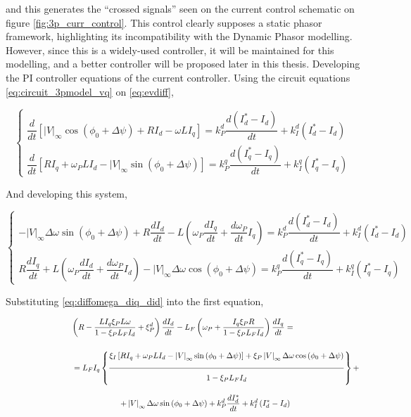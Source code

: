 \begin{example}
	\noindent and this generates the ``crossed signals'' seen on the current control schematic on figure \ref{fig:3p_curr_control}. This control clearly supposes a static phasor framework, highlighting its incompatibility with the Dynamic Phasor modelling. However, since this is a widely-used controller, it will be maintained for this modelling, and a better controller will be proposed later in this thesis. Developing the PI controller equations of the current controller. Using the circuit equations \eqref{eq:circuit_3pmodel_vq} on \eqref{eq:evdiff},

\begin{equation}
\left\{\begin{array}{l}
\dfrac{d}{dt}\left[\left|V\right|_\infty\cos\left(\phi_0+\Delta\psi\right) + RI_d - \omega LI_q\right] = k_P^d\dfrac{d\left(I_d^* - I_d\right)}{dt} + k_I^d\left(I_d^* - I_d\right) \\[5mm]
%
\dfrac{d}{dt}\left[R I_q + \omega_P L I_d - \left|V\right|_\infty\sin\left(\phi_0+\Delta\psi\right)\right] = k_P^q\dfrac{d\left(I_q^* - I_q\right)}{dt} + k_I^q\left(I_q^* - I_q\right) 
\end{array}\right.
\end{equation}

        And developing this system,

\begin{equation}
\left\{\begin{array}{l}
-\left|V\right|_\infty \Delta\omega\sin\left(\phi_0+\Delta\psi\right) + R\dfrac{dI_d}{dt} - L\left(\omega_P \dfrac{dI_q}{dt} + \dfrac{d\omega_P}{dt}I_q\right) = k_P^d\dfrac{d\left(I_d^* - I_d\right)}{dt} + k_I^d\left(I_d^* - I_d\right) \\[5mm]
%
R\dfrac{dI_q}{dt} + L\left(\omega_P \dfrac{dI_d}{dt} + \dfrac{d\omega_P}{dt}I_d\right) - \left|V\right|_\infty\Delta\omega\cos\left(\phi_0+\Delta\psi\right) = k_P^q\dfrac{d\left(I_q^* - I_q\right)}{dt} + k_I^q\left(I_q^* - I_q\right) 
\end{array}\right. \label{sys:idiq_system_1}
\end{equation}

        Substituting \eqref{eq:diffomega_diq_did} into the first equation,

\begin{gather}
\left(R - \dfrac{LI_q\xi_PL\omega}{1-\xi_PL_FI_d} + \xi_P^d\right)\dfrac{dI_d}{dt} - L_F\left(\omega_P + \dfrac{I_q\xi_PR}{1-\xi_PL_FI_d}\right) \dfrac{dI_q}{dt} = \nonumber\\[5mm] \hspace{30mm} = L_FI_q\left\{\xfrac{3mm}{2mm}{\xi_I\left[ RI_q + \omega_P L I_d - \left|V\right|_\infty\sin\left(\phi_0+\Delta\psi\right)\right] + \xi_P \left|V\right|_\infty\Delta\omega \cos\left(\phi_0+\Delta\psi\right)}{1-\xi_PL_FI_d}\right\} + \nonumber\\[3mm] \hspace{20mm} + \left|V\right|_\infty \Delta\omega\sin\left(\phi_0+\Delta\psi\right) + k_P^d\dfrac{dI_d^*}{dt} + k_I^d\left(I_d^* - I_d\right) \label{eq:d_diff_eq}
\end{gather}


\end{example}
